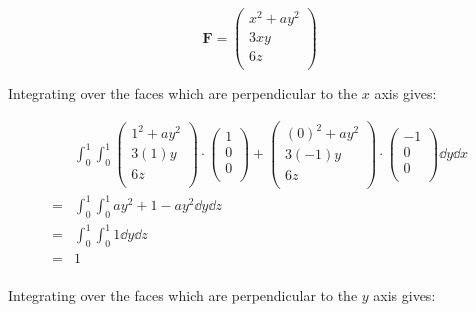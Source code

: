 \documentclass[10pt,\jkfside,a4paper]{article}
\begin{document}
\begin{enumerate}
\begin{enumerate}
\[
\mathbf{F} = \begin{pmatrix} x^2 + ay^2 \\ 3xy \\ 6z \\ \end{pmatrix}
\]

Integrating over the faces which are perpendicular to the $x$ axis gives:

\[
\begin{split}
 & \int^1_0\int^1_0 \begin{pmatrix} 1^2 + ay^2 \\ 3(1)y \\ 6z \\ \end{pmatrix} \cdot \begin{pmatrix} 1 \\ 0 \\ 0 \\ \end{pmatrix} +  \begin{pmatrix} (0)^2 + ay^2 \\ 3(-1)y \\ 6z \\ \end{pmatrix} \cdot \begin{pmatrix} -1 \\ 0 \\ 0 \\ \end{pmatrix} \dd{y}\dd{x} \\
=& \int^1_0\int^1_0 ay^2 + 1 - ay^2 \dd{y}\dd{z} \\
=& \int^1_0\int^1_0 1 \dd{y}\dd{z} \\
=& 1 \\
\end{split}
\]

Integrating over the faces which are perpendicular to the $y$ axis gives:


\end{enumerate}
\end{enumerate}
\end{document}
